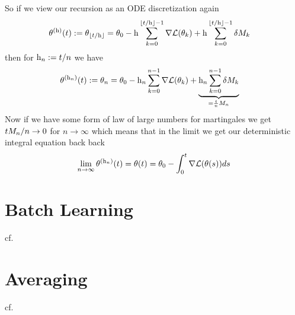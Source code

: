 %
So if we view our recursion as an ODE discretization again
%
\begin{align*}
	\theta^{(\text{h})}(t) &:= \theta_{\lfloor t/\text{h}\rfloor}
	= \theta_0 - \text{h}\sum_{k=0}^{\lfloor t/\text{h}\rfloor-1}\nabla\mathcal{L}(\theta_k)
	+ \text{h}\sum_{k=0}^{\lfloor t/\text{h}\rfloor-1}\delta M_k
\end{align*}
%
then for \(\text{h}_n := t/n\) we have
\begin{align*}
	\theta^{(\text{h}_n)}(t) &:= \theta_n
	= \theta_0 - \text{h}_n\sum_{k=0}^{n-1}\nabla\mathcal{L}(\theta_k)
	+ \underbrace{\text{h}_n\sum_{k=0}^{n-1}\delta M_k}_{
		=\frac{t}{n}M_n
	}
\end{align*}
Now if we have some form of law of large numbers for martingales we get
\(tM_n/n\to 0\) for \(n\to\infty\) which means that in the limit we
get our deterministic integral equation back back
\begin{align*}
	\lim_{n\to\infty}\theta^{(\text{h}_n)}(t) = \theta(t)
	= \theta_0 - \int_0^t \nabla\mathcal{L}(\theta(s))ds
\end{align*}

\section{Batch Learning}

cf. \cite{hardtTrainFasterGeneralize2016} \cite{hofferTrainLongerGeneralize2018}

\section{Averaging}

cf. \cite{bachNonstronglyconvexSmoothStochastic2013}


\endinput
